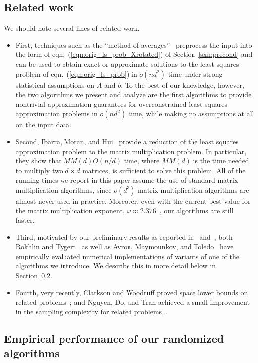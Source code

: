 \documentclass[11pt]{article}
\begin{document}
\subsection{Related work}

We should note several lines of related work.
\begin{itemize}
\item
First, techniques such as the ``method of averages''~\cite{DSS68} preprocess
the input into the form of eqn.~(\ref{eqn:orig_ls_prob_Xrotated}) of
Section~\ref{sxn:precond} and can be used to
obtain exact or approximate solutions to the least squares problem of
eqn.~(\ref{eqn:orig_ls_prob}) in $o(nd^2)$ time under strong statistical
assumptions on $A$ and $b$.
To the best of our knowledge, however, the two algorithms we present and
analyze are the first algorithms to provide nontrivial approximation
guarantees for overconstrained least squares approximation problems in
$o(nd^2)$ time, while making no assumptions at all on the input data.
\item
Second, Ibarra, Moran, and Hui~\cite{IMH82} provide a reduction of the least
squares approximation problem to the matrix multiplication problem.
In particular, they show that $MM(d) O(n/d)$ time, where $MM(d)$ is the time
needed to multiply two $d \times d$ matrices, is sufficient to solve this
problem.
All of the running times we report in this paper assume the use of standard
matrix multiplication algorithms, since $o(d^3)$ matrix multiplication
algorithms are almost never used in practice.
Moreover, even with the current best value for the matrix multiplication
exponent, $\omega \approx 2.376$~\cite{CW87}, our algorithms are still
faster.
\item
Third, motivated by our preliminary results as reported in~\cite{DMM06}
and~\cite{Sarlos06}, both Rokhlin and Tygert~\cite{RT08} as well as Avron,
Maymounkov, and Toledo~\cite{AMT09_DRAFT,AMT10} have empirically evaluated
numerical implementations of variants of one of the algorithms we introduce.
We describe this in more detail below in Section~\ref{sxn:intro-empirical}.
\item
Fourth, very recently, Clarkson and Woodruff proved space lower bounds on
related problems~\cite{CW09}; and Nguyen, Do, and Tran achieved a small
improvement in the sampling complexity for related
problems~\cite{NDT09}.
\end{itemize}

\subsection{Empirical performance of our randomized algorithms}
\label{sxn:intro-empirical}
\end{document}
